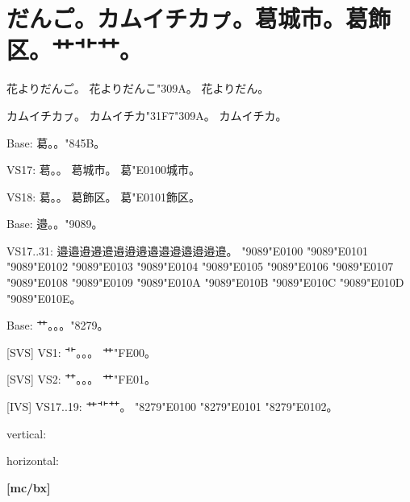 \documentclass[a4paper,titlepage,dvipdfmx]{\class}
\begin{document}
\section{だんこ゚。カムイチカㇷ゚。葛󠄀城市。葛󠄁飾区。艹艹︀艹︁。}

\ifuptexmode
花よりだんこ゚。
花よりだんこ\kchar"309A。
花よりだん。

カムイチカㇷ゚。
カムイチカ\kchar"31F7\kchar"309A。
カムイチカ。



Base:
葛。。\kchar"845B。

VS17:
葛󠄀。。
葛󠄀城市。
葛\kchar"E0100城市。

VS18:
葛󠄁。。
葛󠄁飾区。
葛\kchar"E0101飾区。


Base:
邉。。\kchar"9089。

VS17..31:
邉󠄀邉󠄁邉󠄂邉󠄃邉󠄄邉󠄅邉󠄆邉󠄇邉󠄈邉󠄉邉󠄊邉󠄋邉󠄌邉󠄍邉󠄎。
\kchar"9089\kchar"E0100
\kchar"9089\kchar"E0101
\kchar"9089\kchar"E0102
\kchar"9089\kchar"E0103
\kchar"9089\kchar"E0104
\kchar"9089\kchar"E0105
\kchar"9089\kchar"E0106
\kchar"9089\kchar"E0107
\kchar"9089\kchar"E0108
\kchar"9089\kchar"E0109
\kchar"9089\kchar"E010A
\kchar"9089\kchar"E010B
\kchar"9089\kchar"E010C
\kchar"9089\kchar"E010D
\kchar"9089\kchar"E010E。


Base:
艹。。。\kchar"8279。

[SVS] VS1:
艹︀。。。
艹\kchar"FE00。

[SVS] VS2:
艹︁。。。
艹\kchar"FE01。

[IVS] VS17..19:
艹󠄀艹󠄁艹󠄂。
\kchar"8279\kchar"E0100
\kchar"8279\kchar"E0101
\kchar"8279\kchar"E0102。

\fi

\vspace{\baselineskip}
vertical:

\vspace{\baselineskip}
horizontal:

\clearpage
[mc/m]




{\bfseries%
[mc/bx]




}

\ifdeluxe
{\ltseries%
[mc/l]



}
\fi
\end{document}
